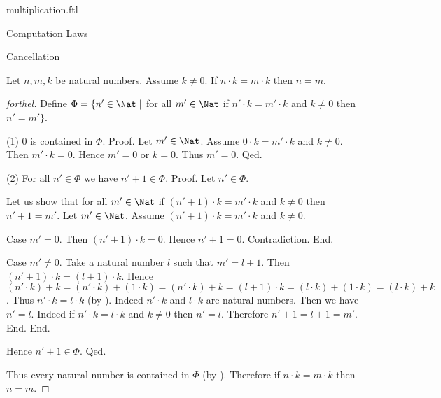 \documentclass{naproche-library}
\begin{document}
\begin{smodule}[title=Multiplication]{multiplication.ftl}
\begin{sfragment}{Computation Laws}
  \begin{sfragment}{Cancellation}
    \begin{proposition}[forthel,id=ARITHMETIC_06_31055184658432]
      Let $n, m, k$ be natural numbers.
      Assume $k \neq 0$.
      If $n \cdot k = m \cdot k$ then $n = m$.
    \end{proposition}
    \begin{proof}[forthel]
      Define $\Phi = \{ n' \in \Nat \mid$ for all $m' \in \Nat$ if $n' \cdot k = m' \cdot k$ and $k \neq 0$ then $n' = m' \}$.

      (1) $0$ is contained in $\Phi$. \newline
      Proof.
        Let $m' \in \Nat$.
        Assume $0 \cdot k = m' \cdot k$ and $k \neq 0$.
        Then $m' \cdot k = 0$.
        Hence $m' = 0$ or $k = 0$.
        Thus $m' = 0$.
      Qed.

      (2) For all $n' \in \Phi$ we have $n' + 1 \in \Phi$. \newline
      Proof.
        Let $n' \in \Phi$.

        Let us show that for all $m' \in \Nat$ if $(n' + 1) \cdot k = m' \cdot k$ and $k \neq 0$ then $n' + 1 = m'$.
          Let $m' \in \Nat$.
          Assume $(n' + 1) \cdot k = m' \cdot k$ and $k \neq 0$.

          Case $m' = 0$.
            Then $(n' + 1) \cdot k = 0$.
            Hence $n' + 1 = 0$.
            Contradiction.
          End.

          Case $m' \neq 0$.
            Take a natural number $l$ such that $m' = l + 1$.
            Then $(n' + 1) \cdot k = (l + 1) \cdot k$.
            Hence $(n' \cdot k) + k
              = (n' \cdot k) + (1 \cdot k)
              = (n' \cdot k) + k
              = (l + 1) \cdot k
              = (l \cdot k) + (1 \cdot k)
              = (l \cdot k) + k$.
            Thus $n' \cdot k = l \cdot k$ (by ).
            Indeed $n' \cdot k$ and $l \cdot k$ are natural numbers.
            Then we have $n' = l$.
            Indeed if $n' \cdot k = l \cdot k$ and $k \neq 0$ then $n' = l$.
            Therefore $n' + 1 = l + 1 = m'$.
          End.
        End.

        Hence $n' + 1 \in \Phi$.
      Qed.

      Thus every natural number is contained in $\Phi$ (by ).
      Therefore if $n \cdot k = m \cdot k$ then $n = m$.
    \end{proof}


\end{sfragment}
\end{sfragment}
\end{smodule}
\end{document}
